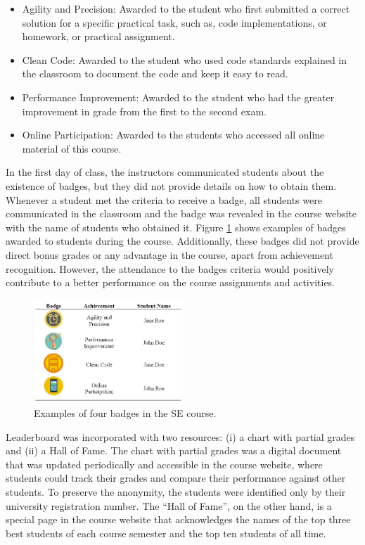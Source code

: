 \begin{itemize}
    \item Agility and Precision: Awarded to the student who first submitted a correct solution for a specific practical task, such as, code implementations, or homework, or practical assignment.
    \item Clean Code: Awarded to the student who used code standards explained in the classroom to document the code and keep it easy to read.
    \item Performance Improvement: Awarded to the student who had the greater improvement in grade from the first to the second exam.
    \item Online Participation: Awarded to the students who accessed all online material of this course.
\end{itemize}
	 
In the first day of class, the instructors communicated students about the existence of badges, but they did not provide details on how to obtain them. Whenever a student met the criteria to receive a badge, all students were communicated in the classroom and the badge was revealed in the course website with the name of students who obtained it. Figure \ref{fig:gamificationbadges} shows examples of badges awarded to students during the course. Additionally, these badges did not provide direct bonus grades or any advantage in the course, apart from achievement recognition. However, the attendance to the badges criteria would positively contribute to a better performance on the course assignments and activities.

\begin{figure}[!h]%
    \centering
    \includegraphics[width = 0.5\textwidth]{img/gamificationBadges.png}
    \caption{Examples of four badges in the SE course.}
    \label{fig:gamificationbadges}
\end{figure}


Leaderboard was incorporated with two resources: (i) a chart with partial grades and (ii) a Hall of Fame. The chart with partial grades was a digital document that was updated periodically and accessible in the course website, where students could track their grades and compare their performance against other students. To preserve the anonymity, the students were identified only by their university registration number. The “Hall of Fame”, on the other hand, is a special page in the course website that acknowledges the names of the top three best students of each course semester and the top ten students of all time. 

